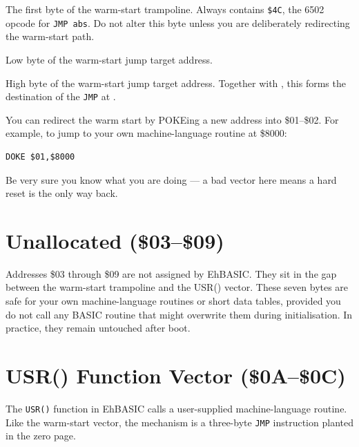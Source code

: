 
The first byte of the warm-start trampoline.  Always contains \texttt{\$4C},
the 6502 opcode for \texttt{JMP abs}.  Do not alter this byte unless you are
deliberately redirecting the warm-start path.


Low byte of the warm-start jump target address.


High byte of the warm-start jump target address.  Together with ,
this forms the destination of the \texttt{JMP} at .

\begin{notebox}
You can redirect the warm start by POKEing a new address into \$01--\$02.
For example, to jump to your own machine-language routine at \$8000:
\begin{lstlisting}
DOKE $01,$8000
\end{lstlisting}
Be very sure you know what you are doing --- a bad vector here means a
hard reset is the only way back.
\end{notebox}

\section{Unallocated (\$03--\$09)}

Addresses \$03 through \$09 are not assigned by EhBASIC.  They sit in the gap
between the warm-start trampoline and the USR() vector.  These seven bytes are
safe for your own machine-language routines or short data tables, provided you
do not call any BASIC routine that might overwrite them during
initialisation.  In practice, they remain untouched after boot.

\section{USR() Function Vector (\$0A--\$0C)}

The \texttt{USR()} function in EhBASIC calls a user-supplied machine-language
routine.  Like the warm-start vector, the mechanism is a three-byte
\texttt{JMP} instruction planted in the zero page.

